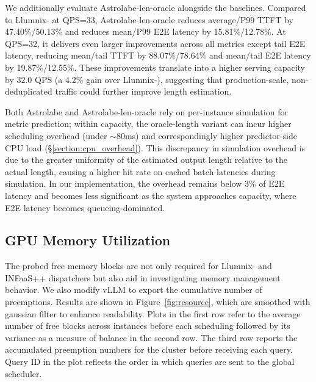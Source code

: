 \documentclass[sigconf, review, anonymous]{acmart}
\begin{document}
We additionally evaluate Astrolabe-len-oracle alongside the baselines. Compared to Llumnix- at QPS=33, Astrolabe-len-oracle reduces average/P99 TTFT by 47.40\%/50.13\% and reduces mean/P99 E2E latency by 15.81\%/12.78\%. At QPS=32, it delivers even larger improvements across all metrics except tail E2E latency, reducing mean/tail TTFT by 88.07\%/78.64\% and mean/tail E2E latency by 19.87\%/12.55\%. These improvements translate into a higher serving capacity by 32.0 QPS (a 4.2\% gain over Llumnix-), suggesting that production-scale, non-deduplicated traffic could further improve length estimation.

Both Astrolabe and Astrolabe-len-oracle rely on per-instance simulation for metric prediction; within capacity, the oracle-length variant can incur higher scheduling overhead (under $\sim$80\;ms) and correspondingly higher predictor-side CPU load (\S\ref{section:cpu_overhead}). This discrepancy in simulation overhead is due to the greater uniformity of the estimated output length relative to the actual length, causing a higher hit rate on cached batch latencies during simulation. In our implementation, the overhead remains below 3\% of E2E latency and becomes less significant as the system approaches capacity, where E2E latency becomes queueing-dominated.


\subsection{GPU Memory Utilization} \label{section:gpu_resources}

The probed free memory blocks are not only required for Llumnix- and INFaaS++ dispatchers but also aid in investigating memory management behavior. We also modify vLLM to export the cumulative number of preemptions. Results are shown in Figure~\ref{fig:resource}, which are smoothed with gaussian filter to enhance readability. Plots in the first row refer to the average number of free blocks across instances before each scheduling followed by its variance as a measure of balance in the second row. The third row reports the accumulated preemption numbers for the cluster before receiving each query. Query ID in the plot reflects the order in which queries are sent to the global scheduler.
\end{document}
